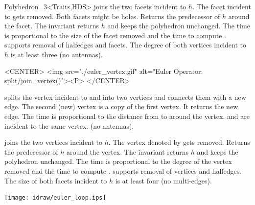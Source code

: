\begin{ccClassTemplate}{Polyhedron_3<Traits,HDS>}
    {joins the two facets incident to $h$. The facet incident to
       gets removed. Both facets might be
    holes. Returns the predecessor of $h$ around the facet. The invariant
     returns $h$ and keeps
    the polyhedron unchanged. The time is proportional to the size of the
    facet removed and the time to compute .
    \ccPrecond {} supports removal of halfedges and facets. The
    degree of both vertices incident to $h$ is at least three (no antennas).}

\begin{ccHtmlOnly}
    <CENTER>
    <img src="./euler_vertex.gif" alt="Euler Operator: split/join_vertex()"><P>
    </CENTER>
\end{ccHtmlOnly}

    {splits the vertex incident to  and  into two vertices
      and connects them with a new edge. The second (new) vertex is a
      copy of the first vertex. It returns the new edge. The time is
      proportional to the distance from  to  around the vertex.
    \ccPrecond {} and  are incident to the same vertex.
                (no antennas).}

    {joins the two vertices incident to $h$. The vertex denoted by
       gets removed. Returns the predecessor of
    $h$ around the vertex. The invariant 
     returns
    $h$ and keeps the polyhedron unchanged. 
    The time is proportional to the degree of the vertex removed and 
    the time to compute .
    \ccPrecond {} supports removal of vertices and halfedges. The
    size of both facets incident to $h$ is at least four (no multi-edges).}

\newpage
{}

\begin{ccTexOnly}
    \begin{center}
      \parbox{0.636\textwidth}{%
          \texttt{[image: idraw/euler\_loop.ips]}%
      }
    \end{center}
\end{ccTexOnly}


\end{ccClassTemplate}
